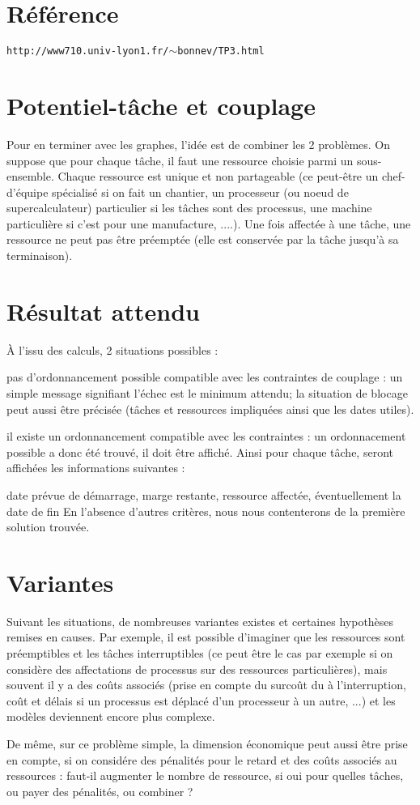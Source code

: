 \section{Référence}\label{index_intro_0}
{\tt http\-://www710.\-univ-\/lyon1.\-fr/$\sim$bonnev/\-T\-P3.\-html} \section{Potentiel-\/tâche et couplage}\label{index_intro_1}
Pour en terminer avec les graphes, l'idée est de combiner les 2 problèmes. On suppose que pour chaque tâche, il faut une ressource choisie parmi un sous-\/ensemble. Chaque ressource est unique et non partageable (ce peut-\/être un chef-\/d'équipe spécialisé si on fait un chantier, un processeur (ou noeud de supercalculateur) particulier si les tâches sont des processus, une machine particulière si c'est pour une manufacture, ....). Une fois affectée à une tâche, une ressource ne peut pas être préemptée (elle est conservée par la tâche jusqu'à sa terminaison).\section{Résultat attendu}\label{index_intro_2}
À l'issu des calculs, 2 situations possibles \-:

pas d'ordonnancement possible compatible avec les contraintes de couplage \-: un simple message signifiant l'échec est le minimum attendu; la situation de blocage peut aussi être précisée (tâches et ressources impliquées ainsi que les dates utiles).

il existe un ordonnancement compatible avec les contraintes \-: un ordonnacement possible a donc été trouvé, il doit être affiché. Ainsi pour chaque tâche, seront affichées les informations suivantes \-:

date prévue de démarrage, marge restante, ressource affectée, éventuellement la date de fin En l'absence d'autres critères, nous nous contenterons de la première solution trouvée.\section{Variantes}\label{index_intro_3}
Suivant les situations, de nombreuses variantes existes et certaines hypothèses remises en causes. Par exemple, il est possible d'imaginer que les ressources sont préemptibles et les tâches interruptibles (ce peut être le cas par exemple si on considère des affectations de processus sur des ressources particulières), mais souvent il y a des coûts associés (prise en compte du surcoût du à l'interruption, coût et délais si un processus est déplacé d'un processeur à un autre, ...) et les modèles deviennent encore plus complexe.

De même, sur ce problème simple, la dimension économique peut aussi être prise en compte, si on considére des pénalités pour le retard et des coûts associés au ressources \-: faut-\/il augmenter le nombre de ressource, si oui pour quelles tâches, ou payer des pénalités, ou combiner ? 